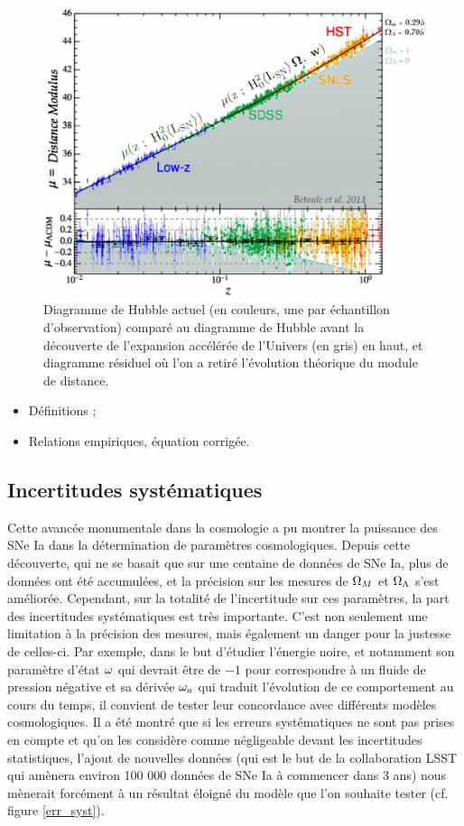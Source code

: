 \documentclass[a4paper, 12pt, svgnames]{article}
\begin{document}
\begin{figure}[htbp!]
    \centering
    \includegraphics[width=.5\linewidth]{Rapport_figures/bet_al_2.PNG}
    \captionsetup{justification=centering}
    \caption{Diagramme de Hubble actuel (en couleurs, une par échantillon
             d'observation) comparé au diagramme de Hubble avant la découverte 
             de l'expansion accélérée de l'Univers (en gris) en haut, et
             diagramme résiduel où l'on a retiré l'évolution théorique du module
             de distance.}
    \label{hub_acc_exp}
\end{figure}

\begin{itemize}
    \item Définitions ;
    \item Relations empiriques, équation corrigée.
\end{itemize}

\subsection{Incertitudes systématiques}\label{ssec:syst}
Cette avancée monumentale dans la cosmologie a pu montrer la puissance des SNe
Ia dans la détermination de paramètres cosmologiques. Depuis cette découverte,
qui ne se basait que sur une centaine de données de SNe Ia, plus de données ont
été accumulées, et la précision sur les mesures de $\Omega_M$ et $\Omega_\Lambda$ s'est
améliorée. Cependant, sur la totalité de l'incertitude sur ces paramètres, la
part des incertitudes systématiques est très importante. C'est non seulement une
limitation à la précision des mesures, mais également un danger pour la justesse
de celles-ci. Par exemple, dans le but d’étudier l’énergie noire, et notamment
son paramètre d’état $\omega$ qui devrait être de $-1$ pour correspondre à un fluide
de pression négative et sa dérivée $\omega_a$ qui traduit l’évolution de ce
comportement au cours du temps, il convient de tester leur concordance avec
différents modèles cosmologiques. Il a été montré que si les erreurs
systématiques ne sont pas prises en compte et qu'on les considère comme
négligeable devant les incertitudes statistiques, l'ajout de nouvelles données
(qui est le but de la collaboration LSST qui amènera environ 100 000 données de
SNe Ia à commencer dans 3 ans) nous mènerait forcément à un résultat éloigné du
modèle que l'on souhaite tester (cf. figure \ref{err_syst}).
\end{document}
